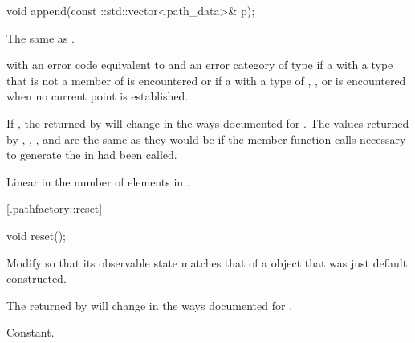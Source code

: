 %
%
\begin{itemdecl}
void append(const ::std::vector<path_data>& p);
\end{itemdecl}
\begin{itemdescr}
	\pnum
	\effects
	The same as .
	
	\pnum
	\throws
	 with an error code equivalent to 
	 and an error category of type 
	 if a  with a type that is not 
	a member of  is encountered or if a  
	with a type of , 
	, or 
	 is encountered when no current point 
	is established.

	\pnum
	\postconditions
	If , the  returned by 
	 will change in the ways documented for 
	.
	The values returned by , 
	, , and 
	 are the same as they would be if the 
	 member function calls necessary to generate the 
	 in  had been called.

	\pnum
	\complexity
	Linear in the number of elements in .
\end{itemdescr}

 [\iotwod.pathfactory::reset] {}

%
%
\begin{itemdecl}
void reset();
\end{itemdecl}
\begin{itemdescr}
	\pnum
	\effects
	Modify  so that its observable state matches that of a 
	 object that was just default constructed.

	\pnum
	\postcondition
	The  returned by  will change 
	in the ways documented for .
	
	\pnum
	\complexity
	Constant.
\end{itemdescr}

